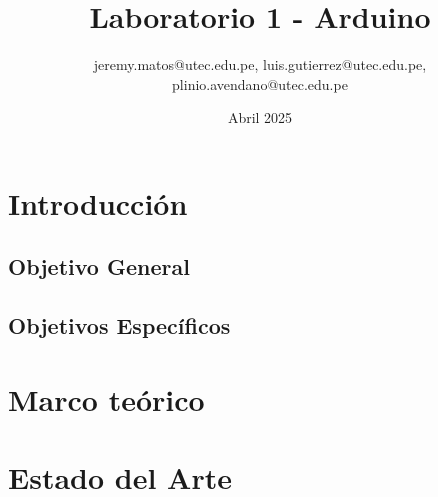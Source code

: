 \documentclass{article}
\title{Laboratorio 1 - Arduino}
\author{jeremy.matos@utec.edu.pe, luis.gutierrez@utec.edu.pe, plinio.avendano@utec.edu.pe}
\date{Abril 2025}
\begin{document}
\maketitle

\newpage
\tableofcontents
\newpage

\section{Introducción}

\subsection{Objetivo General}

\subsection{Objetivos Espec\'ificos}

\newpage

\section{Marco teórico}


\section{Estado del Arte}
\end{document}

